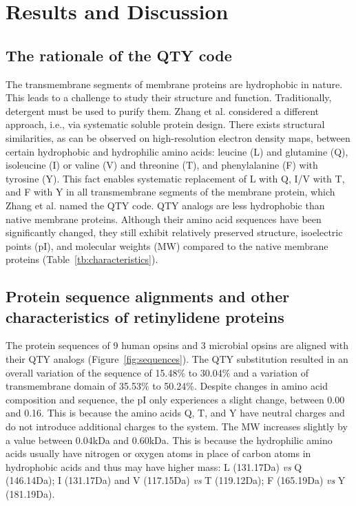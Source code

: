 \documentclass[fleqn, 10pt]{manuscript}
\begin{document}
\section*{Results and Discussion}

\subsection*{The rationale of the QTY code}

The transmembrane segments of membrane proteins are hydrophobic in nature. This leads to a challenge to study their structure and function. Traditionally, detergent must be used to purify them. Zhang et al. considered a different approach, i.e., via systematic soluble protein design. There exists structural similarities, as can be observed on high-resolution electron density maps, between certain hydrophobic and hydrophilic amino acids: leucine (L) and glutamine (Q), isoleucine (I) or valine (V) and threonine (T), and phenylalanine (F) with tyrosine (Y). This fact enables systematic replacement of L with Q, I/V with T, and F with Y in all transmembrane segments of the membrane protein, which Zhang et al. named the QTY code. QTY analogs are less hydrophobic than native membrane proteins. Although their amino acid sequences have been significantly changed, they still exhibit relatively preserved structure, isoelectric points (pI), and molecular weights (MW) compared to the native membrane proteins (Table~\ref{tb:characteristics}). 

\subsection*{Protein sequence alignments and other characteristics of retinylidene proteins}

The protein sequences of 9 human opsins and 3 microbial opsins are aligned with their QTY analogs (Figure~\ref{fig:sequences}). The QTY substitution resulted in an overall variation of the sequence of 15.48\% to 30.04\% and a variation of transmembrane domain of 35.53\% to 50.24\%. Despite changes in amino acid composition and sequence, the pI only experiences a slight change, between 0.00 and 0.16. This is because the amino acids Q, T, and Y have neutral charges and do not introduce additional charges to the system.  The MW increases slightly by a value between 0.04kDa and 0.60kDa. This is because the hydrophilic amino acids usually have nitrogen or oxygen atoms in place of carbon atoms in hydrophobic acids and thus may have higher mass: L (131.17Da) \textit{vs} Q (146.14Da); I (131.17Da) and V (117.15Da) \textit{vs} T (119.12Da); F (165.19Da) \textit{vs} Y (181.19Da). 
\end{document}
